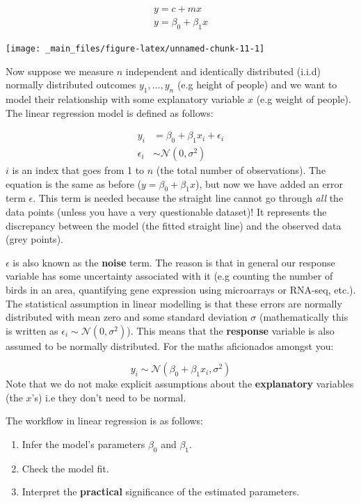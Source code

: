 \documentclass[]{book}
\providecommand{\tightlist}{%
  \setlength{\itemsep}{0pt}\setlength{\parskip}{0pt}}
\theoremstyle{definition}
\theoremstyle{definition}
\theoremstyle{definition}
\theoremstyle{remark}
\begin{document}
\[
\begin{aligned}
y = c + mx\\
y = \beta_0 + \beta_1x
\end{aligned}
\]

\begin{center}\texttt{[image: \_main\_files/figure-latex/unnamed-chunk-11-1]} \end{center}

Now suppose we measure \(n\) independent and identically distributed
(i.i.d) normally distributed outcomes \(y_1,\ldots,y_n\) (e.g height of
people) and we want to model their relationship with some explanatory
variable \(x\) (e.g weight of people). The linear regression model is
defined as follows:

\[
\begin{aligned}
y_i & = \beta_0 + \beta_1x_i + \epsilon_i \\
\epsilon_i & \sim \mathcal{N}(0, \sigma^2)
\end{aligned}
\] \(i\) is an index that goes from 1 to \(n\) (the total number of
observations). The equation is the same as before
(\(y = \beta_0 + \beta_1x\)), but now we have added an error term
\(\epsilon\). This term is needed because the straight line cannot go
through \emph{all} the data points (unless you have a very questionable
dataset)! It represents the discrepancy between the model (the fitted
straight line) and the observed data (grey points).

\(\epsilon\) is also known as the \textbf{noise} term. The reason is
that in general our response variable has some uncertainty associated
with it (e.g counting the number of birds in an area, quantifying gene
expression using microarrays or RNA-seq, etc.). The statistical
assumption in linear modelling is that these errors are normally
distributed with mean zero and some standard deviation \(\sigma\)
(mathematically this is written as
\(\epsilon_i \sim \mathcal{N}(0, \sigma^2)\)). This means that the
\textbf{response} variable is also assumed to be normally distributed.
For the maths aficionados amongst you:

\[
y_i \sim \mathcal{N}(\beta_0 + \beta_1x_i, \sigma^2)
\] Note that we do not make explicit assumptions about the
\textbf{explanatory} variables (the \(x\)'s) i.e they don't need to be
normal.

The workflow in linear regression is as follows:

\begin{enumerate}
\def\labelenumi{\arabic{enumi}.}
\tightlist
\item
  Infer the model's parameters \(\beta_0\) and \(\beta_1\).
\item
  Check the model fit.
\item
  Interpret the \textbf{practical} significance of the estimated
  parameters.
\end{enumerate}
\end{document}

